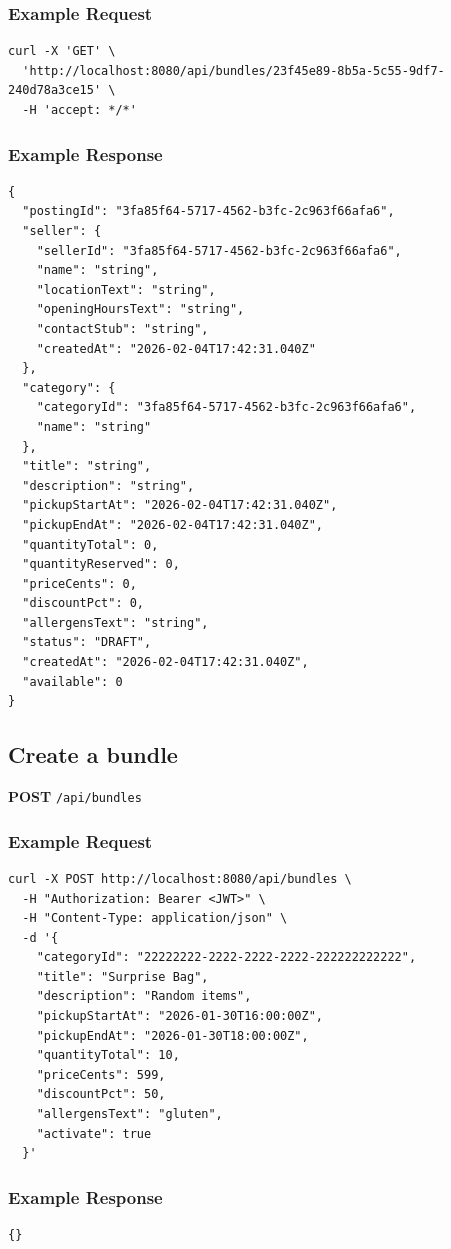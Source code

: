 \documentclass[a4paper,11pt]{article}
\begin{document}
\subsubsection*{Example Request}
\begin{lstlisting}
curl -X 'GET' \
  'http://localhost:8080/api/bundles/23f45e89-8b5a-5c55-9df7-240d78a3ce15' \
  -H 'accept: */*'
\end{lstlisting}

\subsubsection*{Example Response}
\begin{lstlisting}
{
  "postingId": "3fa85f64-5717-4562-b3fc-2c963f66afa6",
  "seller": {
    "sellerId": "3fa85f64-5717-4562-b3fc-2c963f66afa6",
    "name": "string",
    "locationText": "string",
    "openingHoursText": "string",
    "contactStub": "string",
    "createdAt": "2026-02-04T17:42:31.040Z"
  },
  "category": {
    "categoryId": "3fa85f64-5717-4562-b3fc-2c963f66afa6",
    "name": "string"
  },
  "title": "string",
  "description": "string",
  "pickupStartAt": "2026-02-04T17:42:31.040Z",
  "pickupEndAt": "2026-02-04T17:42:31.040Z",
  "quantityTotal": 0,
  "quantityReserved": 0,
  "priceCents": 0,
  "discountPct": 0,
  "allergensText": "string",
  "status": "DRAFT",
  "createdAt": "2026-02-04T17:42:31.040Z",
  "available": 0
}
\end{lstlisting}

\subsection{Create a bundle}
\textbf{POST} \texttt{/api/bundles}
\subsubsection*{Example Request}
\begin{lstlisting}
curl -X POST http://localhost:8080/api/bundles \
  -H "Authorization: Bearer <JWT>" \
  -H "Content-Type: application/json" \
  -d '{
    "categoryId": "22222222-2222-2222-2222-222222222222",
    "title": "Surprise Bag",
    "description": "Random items",
    "pickupStartAt": "2026-01-30T16:00:00Z",
    "pickupEndAt": "2026-01-30T18:00:00Z",
    "quantityTotal": 10,
    "priceCents": 599,
    "discountPct": 50,
    "allergensText": "gluten",
    "activate": true
  }'
\end{lstlisting}

\subsubsection*{Example Response}
\begin{lstlisting}
{}
\end{lstlisting}
\end{document}
